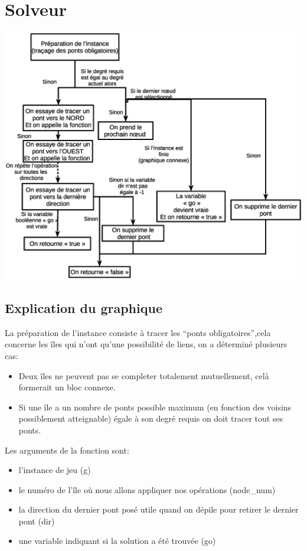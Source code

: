 \documentclass[12pt]{report}
\begin{document}
\chapter{Solveur}
\includegraphics[width = 1.00\textwidth]{explication_solveur.eps}
\section{Explication du graphique}

La préparation de l'instance consiste à tracer les ``ponts obligatoires'',cela concerne les îles qui n'ont qu'une possibilité de liens,
on a déterminé plusieurs cas:
\begin{itemize}
\item Deux îles ne peuvent pas se completer totalement mutuellement, celà formerait un bloc connexe.
\item Si une île a un nombre de ponts possible maximum (en fonction des voisins possiblement atteignable) égale à son degré requis on doit tracer tout ses ponts.
\end{itemize}

Les arguments de la fonction sont:
\begin{itemize}
\item l'instance de jeu (g)
\item le numéro de l'île où nous allons appliquer nos opérations (node\_num)
\item la direction du dernier pont posé utile quand on dépile pour retirer le dernier pont (dir)
\item une variable indiquant si la solution a été trouvée (go)
\end{itemize}
\end{document}
